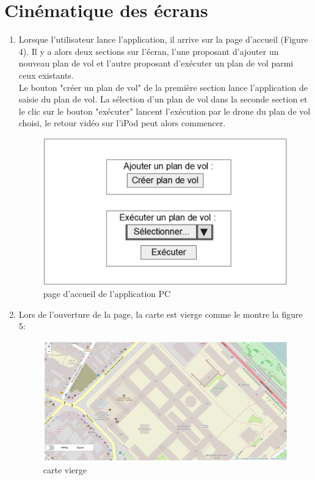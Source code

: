 \documentclass{article}
\begin{document}
\section{Cinématique des écrans}
	
 	\begin{enumerate}
 	\item Lorsque l'utilisateur lance l'application, il arrive sur la page d'accueil (Figure 4). Il y a alors deux sections sur l'écran, l'une proposant d'ajouter un nouveau plan de vol et l'autre proposant d'exécuter un plan de vol parmi ceux existants.\\
 	Le bouton "créer un plan de vol" de la première section lance l'application de saisie du plan de vol. La sélection d'un plan de vol dans la seconde section et le clic sur le bouton "exécuter" lancent l'exécution par le drone du plan de vol choisi, le retour vidéo sur l'iPod peut alors commencer.
 	
 	 \begin{figure}[!ht]
 	\begin{center}
 	\includegraphics[scale=0.65]{maquette_appli_PC.PNG}
 	\caption{page d'accueil de l'application PC}
 	\end{center}
	\end{figure}
 	
 	\item Lors de l'ouverture de la page, la carte est vierge comme le montre la figure 5:
 	\begin{figure}[!ht]
 	\begin{center}
 	\includegraphics[scale=0.42]{capt1.PNG}
 	\caption{carte vierge}
 	\end{center}
	\end{figure}
 	

\end{enumerate}
\end{document}
